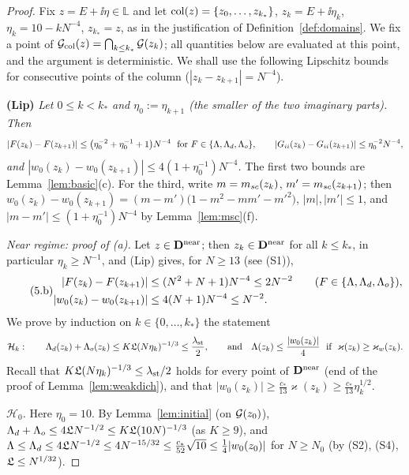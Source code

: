 \begin{proof}
Fix $z=E+\ii\eta\in\mathbb L$ and let ${\rm col}(z)=\{z_0,\dots,z_{k_*}\}$, $z_k=E+\ii\eta_k$, $\eta_k=10-kN^{-4}$, $z_{k_*}=z$, as in the justification of Definition~\ref{def:domains}. We fix a point of
$\mathcal{G}_{\rm col}(z)=\bigcap_{k\le k_*}\mathcal{G}(z_k)$; all quantities below are evaluated at this point, and the argument is deterministic. We shall use the following Lipschitz bounds for consecutive points of the column ($|z_k-z_{k+1}|=N^{-4}$).

\smallskip\noindent\textbf{(Lip)} \emph{Let $0\le k<k_*$ and $\eta_0:=\eta_{k+1}$ (the smaller of the two imaginary parts). Then
\[
 |F(z_k)-F(z_{k+1})|\le\big(\eta_0^{-2}+\eta_0^{-1}+1\big)N^{-4}\ \ \text{for }F\in\{\Lambda,\Ld,\Lo\},\qquad|G_{ii}(z_k)-G_{ii}(z_{k+1})|\le\eta_0^{-2}N^{-4},
\]
and $|w_0(z_k)-w_0(z_{k+1})|\le4(1+\eta_0^{-1})N^{-4}$.} The first two bounds are Lemma~\ref{lem:basic}(c). For the third, write $m=m_{sc}(z_k)$, $m'=m_{sc}(z_{k+1})$; then
$w_0(z_k)-w_0(z_{k+1})=(m-m')\big(1-m^2-mm'-m'^2\big)$, $|m|,|m'|\le1$, and $|m-m'|\le(1+\eta_0^{-1})N^{-4}$ by Lemma~\ref{lem:msc}(f).

\medskip\emph{Near regime: proof of \textup{(a)}.} Let $z\in\mathbf{D}^{\rm near}$; then $z_k\in\mathbf{D}^{\rm near}$ for all $k\le k_*$, in particular $\eta_k\ge N^{-1}$, and (Lip) gives, for $N\ge13$ (see (S1)),
\begin{equation}\tag{5.b}\label{eq:lipnear}
\begin{aligned}
 |F(z_k)-F(z_{k+1})|&\le(N^2+N+1)N^{-4}\le2N^{-2}\qquad(F\in\{\Lambda,\Lambda_d,\Lambda_o\}),\\
 |w_0(z_k)-w_0(z_{k+1})|&\le4(N+1)N^{-4}\le N^{-2}.
\end{aligned}
\end{equation}
We prove by induction on $k\in\{0,\dots,k_*\}$ the statement
\[
 \mathcal H_k:\qquad\Lambda_d(z_k)+\Lambda_o(z_k)\le K\mathfrak{L}(N\eta_k)^{-1/3}\le\frac{\lambda_{\rm st}}2,\qquad\text{and}\quad\Lambda(z_k)\le\frac{|w_0(z_k)|}4\ \text{ if }\ \varkappa(z_k)\ge\varkappa_w(z_k).
\]
Recall that $K\mathfrak{L}(N\eta_k)^{-1/3}\le\lambda_{\rm st}/2$ holds for every point of $\mathbf{D}^{\rm near}$ (end of the proof of Lemma~\ref{lem:weakdich}), and that $|w_0(z_k)|\ge\frac{c_*}{13}\varkappa(z_k)\ge\frac{c_*}{13}\eta_k^{1/2}$.

\emph{$\mathcal H_0$.} Here $\eta_0=10$. By Lemma~\ref{lem:initial} (on $\mathcal{G}(z_0)$), $\Lambda_d+\Lambda_o\le4\mathfrak{L} N^{-1/2}\le K\mathfrak{L}(10N)^{-1/3}$ (as $K\ge9$), and $\Lambda\le\Lambda_d\le4\mathfrak{L} N^{-1/2}\le4N^{-15/32}\le\frac{c_*}{52}\sqrt{10}\le\frac14|w_0(z_0)|$ for $N\ge N_0$
(by (S2), (S4), $\mathfrak{L}\le N^{1/32}$).


\end{proof}
